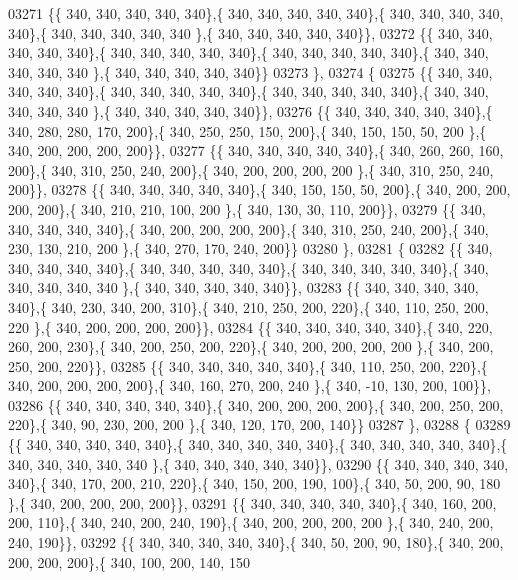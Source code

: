 \begin{DoxyCode}
03271 \{\{ 340, 340, 340, 340, 340\},\{ 340, 340, 340, 340, 340\},\{ 340, 340, 340, 340, 340\},\{ 340, 340, 340, 340, 340
      \},\{ 340, 340, 340, 340, 340\}\},
03272 \{\{ 340, 340, 340, 340, 340\},\{ 340, 340, 340, 340, 340\},\{ 340, 340, 340, 340, 340\},\{ 340, 340, 340, 340, 340
      \},\{ 340, 340, 340, 340, 340\}\}
03273 \},
03274 \{
03275 \{\{ 340, 340, 340, 340, 340\},\{ 340, 340, 340, 340, 340\},\{ 340, 340, 340, 340, 340\},\{ 340, 340, 340, 340, 340
      \},\{ 340, 340, 340, 340, 340\}\},
03276 \{\{ 340, 340, 340, 340, 340\},\{ 340, 280, 280, 170, 200\},\{ 340, 250, 250, 150, 200\},\{ 340, 150, 150,  50, 200
      \},\{ 340, 200, 200, 200, 200\}\},
03277 \{\{ 340, 340, 340, 340, 340\},\{ 340, 260, 260, 160, 200\},\{ 340, 310, 250, 240, 200\},\{ 340, 200, 200, 200, 200
      \},\{ 340, 310, 250, 240, 200\}\},
03278 \{\{ 340, 340, 340, 340, 340\},\{ 340, 150, 150,  50, 200\},\{ 340, 200, 200, 200, 200\},\{ 340, 210, 210, 100, 200
      \},\{ 340, 130,  30, 110, 200\}\},
03279 \{\{ 340, 340, 340, 340, 340\},\{ 340, 200, 200, 200, 200\},\{ 340, 310, 250, 240, 200\},\{ 340, 230, 130, 210, 200
      \},\{ 340, 270, 170, 240, 200\}\}
03280 \},
03281 \{
03282 \{\{ 340, 340, 340, 340, 340\},\{ 340, 340, 340, 340, 340\},\{ 340, 340, 340, 340, 340\},\{ 340, 340, 340, 340, 340
      \},\{ 340, 340, 340, 340, 340\}\},
03283 \{\{ 340, 340, 340, 340, 340\},\{ 340, 230, 340, 200, 310\},\{ 340, 210, 250, 200, 220\},\{ 340, 110, 250, 200, 220
      \},\{ 340, 200, 200, 200, 200\}\},
03284 \{\{ 340, 340, 340, 340, 340\},\{ 340, 220, 260, 200, 230\},\{ 340, 200, 250, 200, 220\},\{ 340, 200, 200, 200, 200
      \},\{ 340, 200, 250, 200, 220\}\},
03285 \{\{ 340, 340, 340, 340, 340\},\{ 340, 110, 250, 200, 220\},\{ 340, 200, 200, 200, 200\},\{ 340, 160, 270, 200, 240
      \},\{ 340, -10, 130, 200, 100\}\},
03286 \{\{ 340, 340, 340, 340, 340\},\{ 340, 200, 200, 200, 200\},\{ 340, 200, 250, 200, 220\},\{ 340,  90, 230, 200, 200
      \},\{ 340, 120, 170, 200, 140\}\}
03287 \},
03288 \{
03289 \{\{ 340, 340, 340, 340, 340\},\{ 340, 340, 340, 340, 340\},\{ 340, 340, 340, 340, 340\},\{ 340, 340, 340, 340, 340
      \},\{ 340, 340, 340, 340, 340\}\},
03290 \{\{ 340, 340, 340, 340, 340\},\{ 340, 170, 200, 210, 220\},\{ 340, 150, 200, 190, 100\},\{ 340,  50, 200,  90, 180
      \},\{ 340, 200, 200, 200, 200\}\},
03291 \{\{ 340, 340, 340, 340, 340\},\{ 340, 160, 200, 200, 110\},\{ 340, 240, 200, 240, 190\},\{ 340, 200, 200, 200, 200
      \},\{ 340, 240, 200, 240, 190\}\},
03292 \{\{ 340, 340, 340, 340, 340\},\{ 340,  50, 200,  90, 180\},\{ 340, 200, 200, 200, 200\},\{ 340, 100, 200, 140, 150

\end{DoxyCode}
